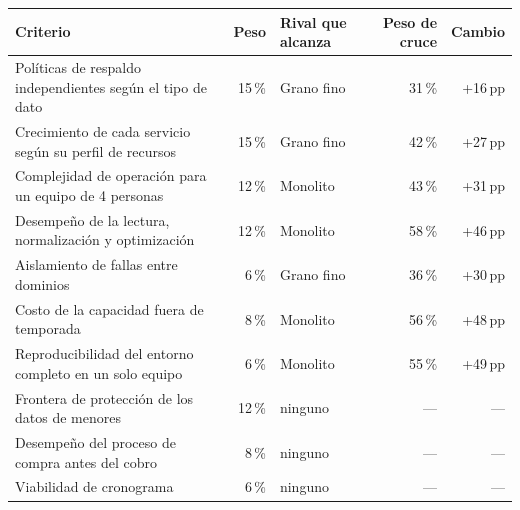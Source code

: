 \begin{tabular}{@{}lrlrr@{}}
\toprule
\textbf{Criterio} & \textbf{Peso} & \textbf{Rival que alcanza} & \textbf{Peso de cruce} & \textbf{Cambio} \\
\midrule
Políticas de respaldo independientes según el tipo de dato & 15\,\% & Grano fino & 31\,\% & +16\,pp \\
Crecimiento de cada servicio según su perfil de recursos & 15\,\% & Grano fino & 42\,\% & +27\,pp \\
Complejidad de operación para un equipo de 4 personas & 12\,\% & Monolito & 43\,\% & +31\,pp \\
Desempeño de la lectura, normalización y optimización & 12\,\% & Monolito & 58\,\% & +46\,pp \\
Aislamiento de fallas entre dominios & 6\,\% & Grano fino & 36\,\% & +30\,pp \\
Costo de la capacidad fuera de temporada & 8\,\% & Monolito & 56\,\% & +48\,pp \\
Reproducibilidad del entorno completo en un solo equipo & 6\,\% & Monolito & 55\,\% & +49\,pp \\
Frontera de protección de los datos de menores & 12\,\% & ninguno & --- & --- \\
Desempeño del proceso de compra antes del cobro & 8\,\% & ninguno & --- & --- \\
Viabilidad de cronograma & 6\,\% & ninguno & --- & --- \\
\bottomrule
\end{tabular}
